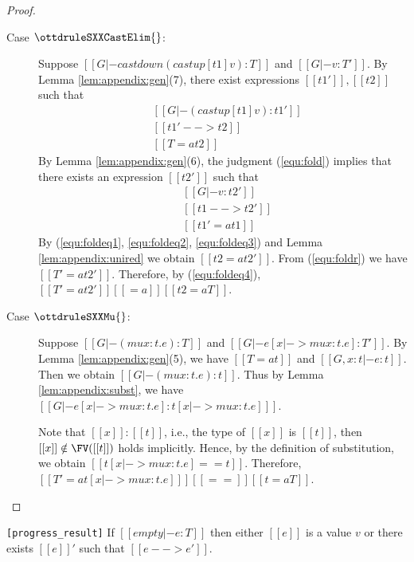 \begin{proof}
\begin{description}
        \item[Case $\ottdruleSXXCastElim{}$:] $\quad$ \\
        Suppose $[[G |- castdown (castup [t1] v) :T]]$ and $[[G |- v :T']]$. By
Lemma \ref{lem:appendix:gen}(7), there exist expressions $[[t1']], [[t2]]$ such
that 
        \begin{align}
            &[[G |- (castup [t1] v):t1']] \label{equ:fold} \\
            &[[t1' --> t2]] \label{equ:foldeq1} \\
            &[[T =a t2 ]] \label{equ:foldeq4}
        \end{align}
        By Lemma \ref{lem:appendix:gen}(6), the judgment (\ref{equ:fold})
implies that there exists an expression $[[t2']]$ such that
        \begin{align}
            &[[G |- v:t2']] \label{equ:foldr} \\
            &[[t1 --> t2']] \label{equ:foldeq2} \\
            &[[t1' =a t1]] \label{equ:foldeq3}
        \end{align}
        By (\ref{equ:foldeq1}, \ref{equ:foldeq2}, \ref{equ:foldeq3}) and Lemma
\ref{lem:appendix:unired} we obtain $[[t2 =a t2']]$. From (\ref{equ:foldr}) we
have $[[T' =a t2' ]]$. Therefore, by (\ref{equ:foldeq4}), $[[T' =a t2' ]]
[[=a]] [[t2 =a T]]$.
        
        \item[Case $\ottdruleSXXMu{}$:] $\quad$ \\
        Suppose $[[G |- (mu x:t.e) :T]]$ and $[[G |- e[x |-> mu x:t.e] :T']]$.
By Lemma \ref{lem:appendix:gen}(5), we have $[[T =a t]]$ and $[[G, x:t |-
e:t]]$. Then we obtain $[[G |- (mu x:t.e) : t]]$. Thus by Lemma
\ref{lem:appendix:subst}, we have $[[G |- e[x |-> mu x:t.e] : t[x |-> mu x:t.e]
]]$.
        
        Note that $[[x]]:[[t]]$, i.e., the type of $[[x]]$ is $[[t]]$, then
$[[x]] \notin \FV([[t]])$ holds implicitly. Hence, by the definition of
substitution, we obtain $[[t[x |-> mu x:t.e] == t]]$. Therefore, $[[T' =a t[x
|-> mu x:t.e] ]] [[==]] [[t =a T]]$.
    \end{description}
\end{proof}

\begin{theorem}[Progress]
\verb|[progress_result]|
If $[[empty |- e:T]]$ then either $[[e]]$ is a value $v$ or there exists $[[e]]'$
such that $[[e --> e']]$.
\end{theorem}


